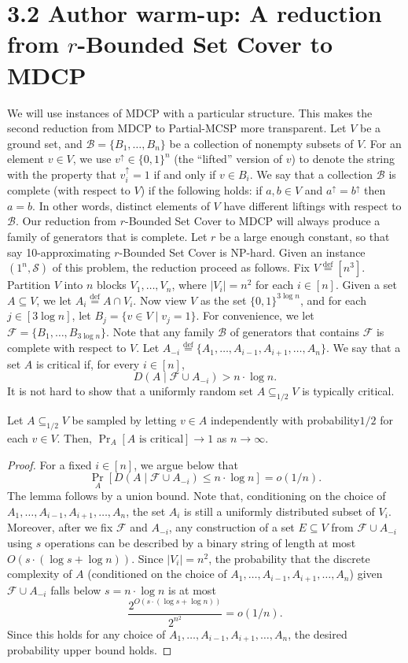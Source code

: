 \section*{3.2 Author warm-up: A reduction from $r$-Bounded Set Cover to MDCP}
We will use instances of MDCP with a particular structure. This makes the second reduction from MDCP to Partial-MCSP more transparent.
Let $V$ be a ground set, and $\mathcal B=\{B_1,\ldots,B_n\}$ be a collection of nonempty subsets of $V$. For an element $v\in V$, we use $v^\uparrow\in\{0,1\}^n$ (the ``lifted'' version of $v$) to denote the string with the property that $v_i^\uparrow=1$ if and only if $v\in B_i$. We say that a collection $\mathcal B$ is complete (with respect to $V$) if the following holds: if $a,b\in V$ and $a^\uparrow=b^\uparrow$ then $a=b$. In other words, distinct elements of $V$ have different liftings with respect to $\mathcal B$. Our reduction from $r$-Bounded Set Cover to MDCP will always produce a family of generators that is complete.
Let $r$ be a large enough constant, so that say 10-approximating $r$-Bounded Set Cover is NP-hard. Given an instance $(1^n,\mathcal S)$ of this problem, the reduction proceed as follows. Fix $V\stackrel{\mathrm{def}}=[n^3]$. Partition $V$ into $n$ blocks $V_1,\ldots,V_n$, where $|V_i|=n^2$ for each $i\in[n]$. Given a set $A\subseteq V$, we let $A_i\stackrel{\mathrm{def}}=A\cap V_i$. Now view $V$ as the set $\{0,1\}^{3\log n}$, and for each $j\in[3\log n]$, let $B_j=\{v\in V\mid v_j=1\}$. For convenience, we let $\mathcal F=\{B_1,\ldots,B_{3\log n}\}$. Note that any family $\mathcal B$ of generators that contains $\mathcal F$ is complete with respect to $V$.
Let $A_{-i}\stackrel{\mathrm{def}}=\{A_1,\ldots,A_{i-1},A_{i+1},\ldots,A_n\}$. We say that a set $A$ is critical if, for every $i\in[n]$,
\[D(A\mid\mathcal F\cup A_{-i})>n\cdot\log n.\]
It is not hard to show that a uniformly random set $A\subseteq_{1/2}V$ is typically critical.
\setcounter{nttheorem}{8}
\begin{ntlemma}
Let $A\subseteq_{1/2}V$ be sampled by letting $v\in A$ independently with probability$1/2$ for each $v\in V$. Then, $\Pr_A[A\text{ is critical}]\to1$ as $n\to\infty$.
\end{ntlemma}
\begin{proof}
For a fixed $i\in[n]$, we argue below that
\[\Pr_A[D(A\mid\mathcal F\cup A_{-i})\leq n\cdot\log n]=o(1/n).\]
The lemma follows by a union bound.
Note that, conditioning on the choice of $A_1,\ldots,A_{i-1},A_{i+1},\ldots,A_n$, the set $A_i$ is still a uniformly distributed subset of $V_i$. Moreover, after we fix $\mathcal F$ and $A_{-i}$, any construction of a set $E\subseteq V$ from $\mathcal F\cup A_{-i}$ using $s$ operations can be described by a binary string of length at most $O(s\cdot(\log s+\log n))$. Since $|V_i|=n^2$, the probability that the discrete complexity of $A$ (conditioned on the choice of $A_1,\ldots,A_{i-1},A_{i+1},\ldots,A_n$) given $\mathcal F\cup A_{-i}$ falls below $s=n\cdot\log n$ is at most
\[\frac{2^{O(s\cdot(\log s+\log n))}}{2^{n^2}}=o(1/n).\]
Since this holds for any choice of $A_1,\ldots,A_{i-1},A_{i+1},\ldots,A_n$, the desired probability upper bound holds.
\end{proof}
